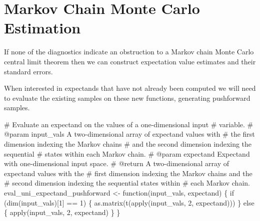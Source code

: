 \documentclass[
  letterpaper,
  DIV=11,
  numbers=noendperiod]{scrartcl}
\newenvironment{Shaded}{\begin{snugshade}}{\end{snugshade}}
\newcommand{\BuiltInTok}[1]{\textcolor[rgb]{0.00,0.23,0.31}{#1}}
\newcommand{\CommentTok}[1]{\textcolor[rgb]{0.37,0.37,0.37}{#1}}
\newcommand{\ControlFlowTok}[1]{\textcolor[rgb]{0.00,0.23,0.31}{#1}}
\newcommand{\DecValTok}[1]{\textcolor[rgb]{0.68,0.00,0.00}{#1}}
\newcommand{\ImportTok}[1]{\textcolor[rgb]{0.00,0.46,0.62}{#1}}
\newcommand{\NormalTok}[1]{\textcolor[rgb]{0.00,0.23,0.31}{#1}}
\newcommand{\OperatorTok}[1]{\textcolor[rgb]{0.37,0.37,0.37}{#1}}
\begin{document}
\section{Markov Chain Monte Carlo
Estimation}\label{markov-chain-monte-carlo-estimation}

If none of the diagnostics indicate an obstruction to a Markov chain
Monte Carlo central limit theorem then we can construct expectation
value estimates and their standard errors.

When interested in expectands that have not already been computed we
will need to evaluate the existing samples on these new functions,
generating pushforward samples.

\begin{Shaded}
\begin{Highlighting}[]
\CommentTok{\# Evaluate an expectand on the values of a one{-}dimensional input}
\CommentTok{\# variable.}
\CommentTok{\# @param input\_vals A two{-}dimensional array of expectand values with}
\CommentTok{\#                   the first dimension indexing the Markov chains}
\CommentTok{\#                   and the second dimension indexing the sequential}
\CommentTok{\#                   states within each Markov chain.}
\CommentTok{\# @param expectand Expectand with one{-}dimensional input space.}
\CommentTok{\# @return A two{-}dimensional array of expectand values with the }
\CommentTok{\#         first dimension indexing the Markov chains and the }
\CommentTok{\#         second dimension indexing the sequential states within }
\CommentTok{\#         each Markov chain.}
\NormalTok{eval\_uni\_expectand\_pushforward }\OperatorTok{\textless{}{-}}\NormalTok{ function(input\_vals, expectand) \{}
  \ControlFlowTok{if}\NormalTok{ (dim(input\_vals)[}\DecValTok{1}\NormalTok{] }\OperatorTok{==} \DecValTok{1}\NormalTok{) \{}
    \ImportTok{as}\NormalTok{.matrix(t(}\BuiltInTok{apply}\NormalTok{(input\_vals, }\DecValTok{2}\NormalTok{, expectand)))}
\NormalTok{  \} }\ControlFlowTok{else}\NormalTok{ \{}
    \BuiltInTok{apply}\NormalTok{(input\_vals, }\DecValTok{2}\NormalTok{, expectand)}
\NormalTok{  \}}
\NormalTok{\}}
\end{Highlighting}
\end{Shaded}
\end{document}

